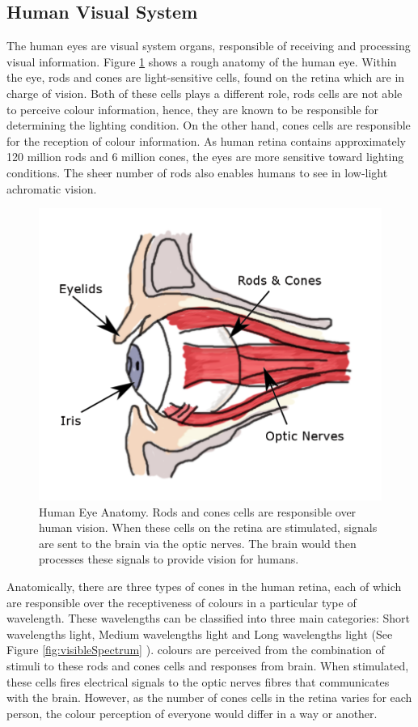 \subsection{Human Visual System}
\label{section:eyes}
The human eyes are visual system organs, responsible of receiving and processing visual information. Figure \ref{fig:eyes} shows a rough anatomy of the human eye. Within the eye, rods and cones are light-sensitive cells, found on the retina which are in charge of vision. Both of these cells plays a different role, rods cells are not able to perceive colour information, hence, they are known to be responsible for determining the lighting condition. On the other hand, cones cells are responsible for the reception of colour information. As human retina contains approximately 120 million rods and 6 million cones, the eyes are more sensitive toward lighting conditions. The sheer number of rods also enables humans to see in low-light achromatic vision.   


\begin{figure}[hbt!]\centering
\includegraphics[width=.5\textwidth]{image/lit/rodsandconscolored.png}
\caption[Human Eye Anatomy]{Human Eye Anatomy. Rods and cones cells are responsible over human vision. When these cells on the retina are stimulated, signals are sent to the brain via the optic nerves. The brain would then processes these signals to provide vision for humans.}
\label{fig:eyes}
\end{figure}

Anatomically, there are three types of cones in the human retina, each of which are responsible over the receptiveness of colours in a particular type of wavelength. These wavelengths can be classified into three main categories: Short wavelengths light, Medium  wavelengths light and Long wavelengths light (See Figure \ref{fig:visibleSpectrum} \cite{eyespectrum}). colours are perceived from the combination of stimuli to these rods and cones cells and responses from brain. When stimulated, these cells fires electrical signals to the optic nerves fibres that communicates with the brain. However, as the number of cones cells in the retina varies for each person, the colour perception of everyone would differ in a way or another. 


